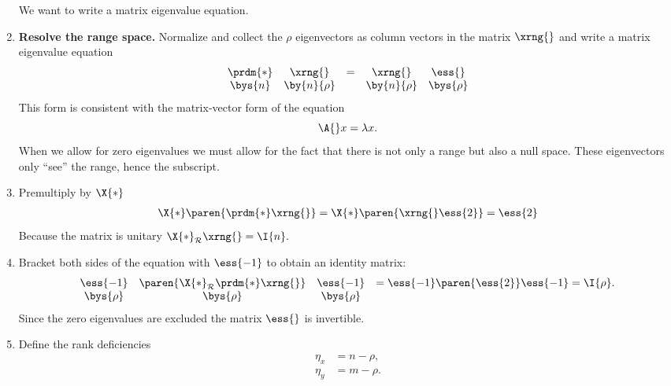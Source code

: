 \begin{enumerate}
\begin{equation}
\end{equation}
\subitem We want to write a matrix eigenvalue equation.
\item \textbf{Resolve the range space.} Normalize and collect the $\rho$ eigenvectors as column vectors in the matrix $\xrng{}$ and write a matrix eigenvalue equation
\begin{equation}
\begin{array}{ccccc}
  \prdm{*}&\xrng{} &=& \xrng{}&\ess{}\\
  \bys{n} & \by{n}{\rho} && \by{n}{\rho} & \bys{\rho}
  \label{eq:proofs:a}
\end{array}
\end{equation}
\subitem This form is consistent with the matrix-vector form of the equation
\begin{equation}
  \A{}x = \lambda x.
\end{equation}
\subitem When we allow for zero eigenvalues we must allow for the fact that there is not only a range but also a null space. These eigenvectors only ``see'' the range, hence the subscript.
\item Premultiply by $\X{*}$
\begin{equation}
  \begin{split}
     \X{*}\paren{\prdm{*}\xrng{}} = \X{*}\paren{\xrng{}\ess{2}} = \ess{2}
   \end{split}
 \label{eq:proofs:b}
\end{equation}
\subitem Because the matrix is unitary $\X{*}_{\mathcal{R}}\xrng{} = \I{n}.$
\item Bracket both sides of the equation with $\ess{-1}$ to obtain an identity matrix:
\begin{equation}
\begin{array}{cccl}
  \ess{-1} & \paren{\X{*}_{\mathcal{R}}\prdm{*}\xrng{}} & \ess{-1} & = \ess{-1}\paren{\ess{2}}\ess{-1} = \I{\rho}.\\
  \bys{\rho} & \bys{\rho} & \bys{\rho} 
\end{array}
\end{equation}
\subitem Since the zero eigenvalues are excluded the matrix $\ess{}$ is invertible.
\item Define the rank deficiencies
\begin{equation}
  \begin{split}
     \eta_{x} &= n - \rho,\\
     \eta_{y} &= m - \rho.
  \end{split}
\end{equation}

\end{enumerate}
